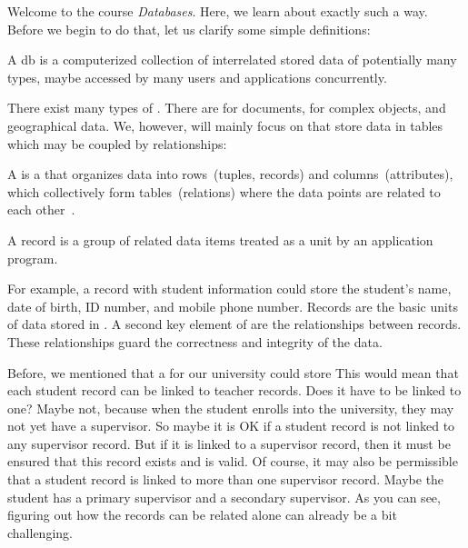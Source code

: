 Welcome to the course \emph{Databases}.
Here, we learn about exactly such a way.
Before we begin to do that, let us clarify some simple definitions:%
%
\begin{definition}[Database]%
A \acrfull{db} is a computerized collection of interrelated stored data of potentially many types, maybe accessed by many users and applications concurrently.%
\end{definition}%
%
There exist many types of .
There are  for documents,  for complex objects, and  geographical data.
We, however, will mainly focus on  that store data in tables which may be coupled by relationships:%
%
\begin{definition}%
A  is a  that organizes data into rows~(tuples, records) and columns~(attributes), which collectively form tables~(relations) where the data points are related to each other~\cite{I2021WIARDB,C1970ARMODFLSDB,SC1975OTPOARADI,T2018ISARD,H2016RDDAI,HM2024IMARD}.
\end{definition}%
%
\begin{definition}[Record]%
A record is a group of related data items treated as a unit by an application program.%
\end{definition}%
%
For example, a record with student information could store the student's name, date of birth, ID number, and mobile phone number.
Records are the basic units of data stored in .
A second key element of  are the relationships between records.
These relationships guard the correctness and integrity of the data.

Before, we mentioned that a  for our university could store 
This would mean that each student record can be linked to teacher records.
Does it have to be linked to one?
Maybe not, because when the student enrolls into the university, they may not yet have a supervisor.
So maybe it is OK if a student record is not linked to any supervisor record.
But if it is linked to a supervisor record, then it must be ensured that this record exists and is valid.
Of course, it may also be permissible that a student record is linked to more than one supervisor record.
Maybe the student has a primary supervisor and a secondary supervisor.
As you can see, figuring out how the records can be related alone can already be a bit challenging.%

